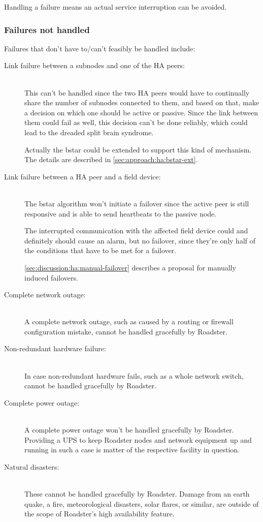 Handling a failure means an actual service interruption can be avoided.

\subsubsection{Failures not handled}
Failures that don't have to/can't feasibly be handled include:

\begin{description}
	\item [Link failure between a subnodes and one of the HA peers:]\hfill\\

		This can't be handled since the two HA peers would have to
		continually share the number of subnodes connected to them, and
		based on that, make a decision on which one should be active or
		passive. Since the link between them could fail as well, this
		decision can't be done reliably, which could lead to the
		dreaded split brain syndrome.

		Actually the \gls{bstar} could be extended to support this kind
		of mechanism. The details are described in
		\autoref{sec:approach:ha:bstar-ext}.


	\item [Link failure between a HA peer and a field device:]\hfill\\
		The \gls{bstar} algorithm won't initiate a failover since the
		active peer is still responsive and is able to send heartbeats to the passive node.

		The interrupted communication with the affected field device
		could and definitely should cause an alarm, but no failover,
		since they're only half of the conditions that have to be met
		for a failover.

		\autoref{sec:discussion:ha:manual-failover} describes a
		proposal for manually induced failovers.

	\item [ Complete network outage:]\hfill\\
		A complete network outage, such as caused by a routing or
		firewall configuration mistake, cannot be handled gracefully by
		Roadster.

	\item [ Non-redundant hardware failure:]\hfill\\
		In case non-redundant hardware fails, such as a whole network
		switch, cannot be handled gracefully by Roadster.

	\item [ Complete power outage:]\hfill\\
		A complete power outage won't be handled gracefully by
		Roadster. Providing a \gls{UPS} to keep Roadster nodes and
		network equipment up and running in such a case is matter of
		the respective facility in question.

	\item [ Natural disasters:]\hfill\\
		These cannot be handled gracefully by Roadster. Damage from an
		earth quake, a fire, meteorological disasters, solar flares, or
		similar, are outside of the scope of Roadster's high
		availability feature.
\end{description}

